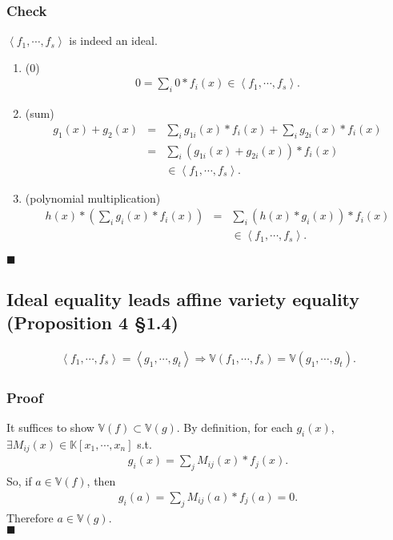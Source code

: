 \documentclass[11pt]{book}
\begin{document}
\subsubsection{Check}
$\left< f_1, \cdots, f_s \right> $ is indeed an ideal.
\begin{enumerate}
\item (0)
\begin{eqnarray}
0 = \sum_i 0 * f_i(x) \in \left< f_1, \cdots, f_s \right>.
\end{eqnarray}

\item (sum)
\begin{eqnarray}
g_1(x) + g_2(x) &=& \sum_i g_{1i}(x) * f_i(x) + \sum_i g_{2i}(x) * f_i(x) \\
&=& \sum_i (g_{1i}(x) + g_{2i}(x)) * f_i(x) \\
&& \in \left< f_1, \cdots, f_s \right>.
\end{eqnarray}

\item (polynomial multiplication)
\begin{eqnarray}
h(x) * \left(\sum_i g_{i}(x) * f_i(x) \right) &=& \sum_i \left( h(x) *g_{i}(x) \right) * f_i(x) \\
&& \in \left< f_1, \cdots, f_s \right>.
\end{eqnarray}

\end{enumerate}
$\blacksquare$

\subsection{Ideal equality leads affine variety equality (Proposition 4 \S1.4)}
\begin{eqnarray}
\left< f_1, \cdots, f_s \right> = \left< g_1, \cdots, g_t \right> \Rightarrow \mathbb{V}(f_1, \cdots, f_s) = \mathbb{V}(g_1, \cdots, g_t).
\end{eqnarray}

\subsubsection{Proof}
It suffices to show $\mathbb{V}(f) \subset \mathbb{V}(g)$.
By definition, for each $g_i(x)$, $\exists M_{ij}(x) \in \mathbb{K}[x_1,\cdots,x_n]$ s.t.
\begin{eqnarray}
g_i(x) = \sum_j M_{ij}(x) * f_j(x).
\end{eqnarray}
So, if $a \in \mathbb{V}(f)$, then
\begin{eqnarray}
g_i(a) = \sum_j M_{ij}(a) * f_j(a) = 0.
\end{eqnarray}
Therefore $a \in \mathbb{V}(g)$.\\
$\blacksquare$
\end{document}
